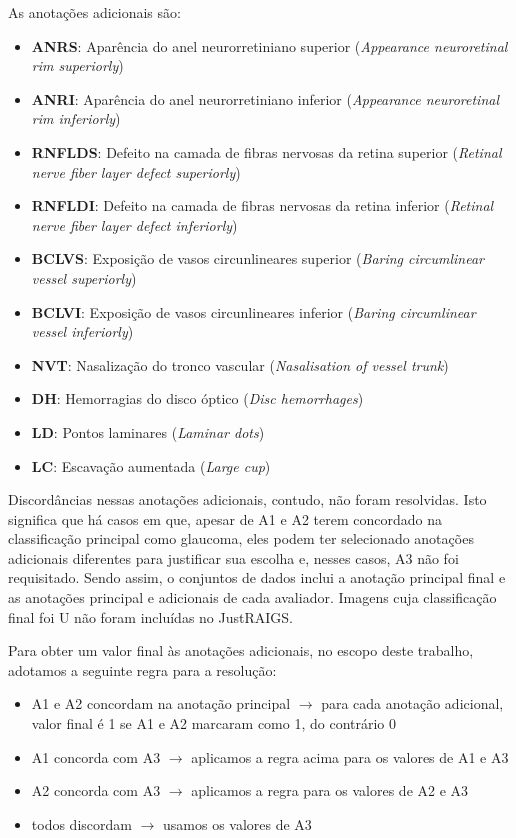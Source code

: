 \documentclass[12pt]{article}
\begin{document}
As anotações adicionais são:
\begin{itemize}
    \item \textbf{ANRS}: Aparência do anel neurorretiniano superior (\emph{Appearance neuroretinal rim superiorly})
    \item \textbf{ANRI}: Aparência do anel neurorretiniano inferior (\emph{Appearance neuroretinal rim inferiorly})
    \item \textbf{RNFLDS}: Defeito na camada de fibras nervosas da retina superior (\emph{Retinal nerve fiber layer defect superiorly})
    \item \textbf{RNFLDI}: Defeito na camada de fibras nervosas da retina inferior (\emph{Retinal nerve fiber layer defect inferiorly})
    \item \textbf{BCLVS}: Exposição de vasos circunlineares superior (\emph{Baring circumlinear vessel superiorly})
    \item \textbf{BCLVI}: Exposição de vasos circunlineares inferior (\emph{Baring circumlinear vessel inferiorly})
    \item \textbf{NVT}: Nasalização do tronco vascular (\emph{Nasalisation of vessel trunk})
    \item \textbf{DH}: Hemorragias do disco óptico (\emph{Disc hemorrhages})
    \item \textbf{LD}: Pontos laminares (\emph{Laminar dots})
    \item \textbf{LC}: Escavação aumentada (\emph{Large cup})
\end{itemize}

Discordâncias nessas anotações adicionais, contudo, não foram resolvidas. Isto significa que há casos em que, apesar de A1 e A2 terem concordado na classificação principal como glaucoma, eles podem ter selecionado anotações adicionais diferentes para justificar sua escolha e, nesses casos, A3 não foi requisitado. Sendo assim, o conjuntos de dados inclui a anotação principal final e as anotações principal e adicionais de cada avaliador. Imagens cuja classificação final foi U não foram incluídas no JustRAIGS.

Para obter um valor final às anotações adicionais, no escopo deste trabalho, adotamos a seguinte regra para a resolução:

\begin{itemize}
    \item A1 e A2 concordam na anotação principal $\rightarrow$ para cada anotação adicional, valor final é 1 se A1 e A2 marcaram como 1, do contrário 0
    \item A1 concorda com A3 $\rightarrow$ aplicamos a regra acima para os valores de A1 e A3
    \item A2 concorda com A3 $\rightarrow$ aplicamos a regra para os valores de A2 e A3
    \item todos discordam $\rightarrow$ usamos os valores de A3
\end{itemize}
\end{document}
